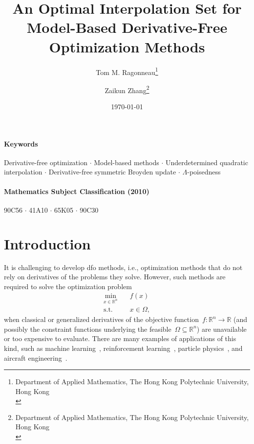\documentclass[draft]{article}
\title{An Optimal Interpolation Set for Model-Based Derivative-Free Optimization Methods}
\author{
    Tom M. Ragonneau\thanks{
        Department of Applied Mathematics, The Hong Kong Polytechnic University, Hong Kong\\
        \email{tom.ragonneau@polyu.edu.hk} \quad \website[globe-asia]{www.tomragonneau.com}
    }\orcid{0000-0003-2717-2876} \and
    Zaikun Zhang\thanks{
        Department of Applied Mathematics, The Hong Kong Polytechnic University, Hong Kong\\
        \email{zaikun.zhang@polyu.edu.hk} \quad \website[globe-asia]{www.zhangzk.net}
    }\orcid{0000-0001-8934-8190}
}
\date{\today}
\numberwithin{equation}{section}
\theoremstyle{definition}
\theoremstyle{plain}
\newcommand{\fset}{\Omega}
\newcommand{\obj}{f}
\newcommand{\R}{\mathbb{R}}
\begin{document}
\maketitle

\begin{abstract}
\end{abstract}

\paragraph*{Keywords}
Derivative-free optimization $\cdot$ Model-based methods $\cdot$ Underdetermined quadratic interpolation $\cdot$ Derivative-free symmetric Broyden update $\cdot$ $\Lambda$-poisedness

\paragraph*{Mathematics Subject Classification (2010)}
90C56 $\cdot$ 41A10 $\cdot$ 65K05 $\cdot$ 90C30

\section{Introduction}

It is challenging to develop \gls{dfo} methods, i.e., optimization methods that do not rely on derivatives of the problems they solve.
However, such methods are required to solve the optimization problem
\begin{equation}
    \label{eq:nlp}
    \begin{aligned}
        \min_{x \in \R^n}   & \quad \obj(x)\\
        \text{s.t.}         & \quad x \in \fset,
    \end{aligned}
\end{equation}
when classical or generalized derivatives of the objective function~$\obj : \R^n \to \R$ (and possibly the constraint functions underlying the feasible~$\fset \subseteq \R^n$) are unavailable or too expensive to evaluate.
There are many examples of applications of this kind, such as machine learning~\cite{Ghanbari_Scheinberg_2017}, reinforcement learning~\cite{Qian_Yu_2021}, particle physics~\cite{Eldred_Etal_2022}, and aircraft engineering~\cite{Gazaix_Etal_2019}.
\end{document}
